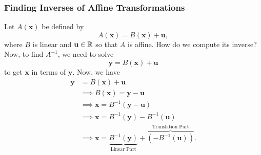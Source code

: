 \documentclass[letterpaper]{article}
\begin{document}
\subsubsection{Finding Inverses of Affine Transformations}
Let $A(\mathbf{x})$ be defined by 
\[A(\mathbf{x}) = B(\mathbf{x}) + \mathbf{u},\]
where $B$ is linear and $\mathbf{u} \in \mathbb{R}$ so that $A$ is affine. How do we compute its inverse? Now, to find $A^{-1}$, we need to solve 
\[\mathbf{y} = B(\mathbf{x}) + \mathbf{u}\]
to get $\mathbf{x}$ in terms of $\mathbf{y}$. Now, we have 
\begin{equation*}
    \begin{aligned}
        \mathbf{y} &= B(\mathbf{x}) + \mathbf{u} \\ 
            &\implies B(\mathbf{x}) = \mathbf{y} - \mathbf{u} \\ 
            &\implies \mathbf{x} = B^{-1}(\mathbf{y} - \mathbf{u}) \\ 
            &\implies \mathbf{x} = B^{-1}(\mathbf{y}) - B^{-1}(\mathbf{u}) \\ 
            &\implies \mathbf{x} = \underbrace{B^{-1}(\mathbf{y})}_{\text{Linear Part}} + \overbrace{(-B^{-1}(\mathbf{u}))}^{\text{Translation Part}}.
    \end{aligned}
\end{equation*}
\end{document}
